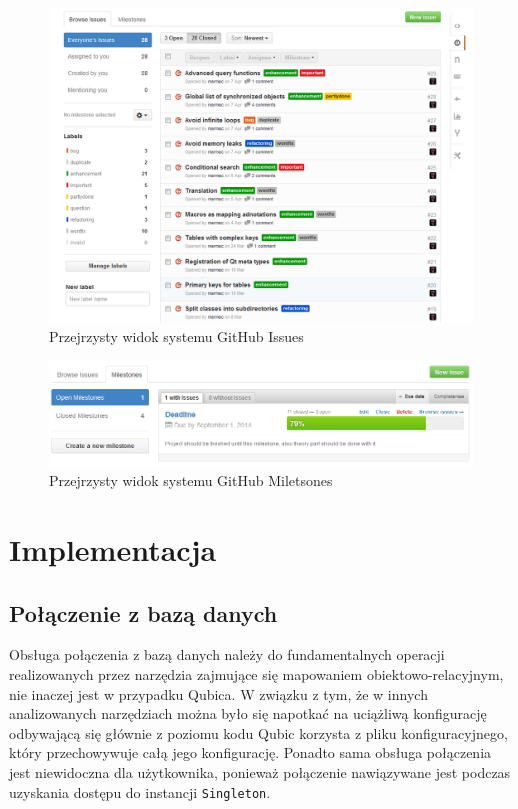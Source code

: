 \documentclass[12pt]{report}
\begin{document}
\begin{figure}[h]
\centering
\includegraphics[width=\textwidth]{resources/githubissue.png}
\caption{Przejrzysty widok systemu GitHub Issues}
\end{figure}

\begin{figure}[h!]
\centering
\includegraphics[width=\textwidth]{resources/githubmilestone.png}
\caption{Przejrzysty widok systemu GitHub Miletsones}
\end{figure}

\section{Implementacja}

\subsection{Połączenie z bazą danych}

Obsługa połączenia z bazą danych należy do fundamentalnych operacji realizowanych przez narzędzia zajmujące się mapowaniem obiektowo-relacyjnym, nie inaczej jest w
przypadku Qubica. W związku z tym, że w innych analizowanych narzędziach można było się napotkać na uciążliwą konfigurację odbywającą się głównie z poziomu kodu
Qubic korzysta z pliku konfiguracyjnego, który przechowywuje całą jego konfigurację. Ponadto sama obsługa połączenia jest niewidoczna dla użytkownika, ponieważ
połączenie nawiązywane jest podczas uzyskania dostępu do instancji {\tt Singleton}. 
\end{document}
